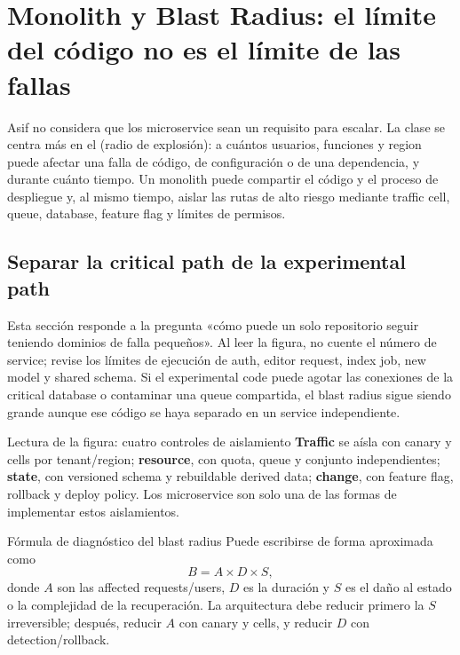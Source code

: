 \section{Monolith y Blast Radius: el límite del código no es el límite de las fallas}

Asif no considera que los microservice sean un requisito para escalar. La clase se centra más en el  (radio de explosión): a cuántos usuarios, funciones y region puede afectar una falla de código, de configuración o de una dependencia, y durante cuánto tiempo. Un monolith puede compartir el código y el proceso de despliegue y, al mismo tiempo, aislar las rutas de alto riesgo mediante traffic cell, queue, database, feature flag y límites de permisos.

\subsection{Separar la critical path de la experimental path}

Esta sección responde a la pregunta «cómo puede un solo repositorio seguir teniendo dominios de falla pequeños». Al leer la figura, no cuente el número de service; revise los límites de ejecución de auth, editor request, index job, new model y shared schema. Si el experimental code puede agotar las conexiones de la critical database o contaminar una queue compartida, el blast radius sigue siendo grande aunque ese código se haya separado en un service independiente.


\begin{knowledgebox}{Lectura de la figura: cuatro controles de aislamiento}
\textbf{Traffic} se aísla con canary y cells por tenant/region; \textbf{resource}, con quota, queue y conjunto independientes; \textbf{state}, con versioned schema y rebuildable derived data; \textbf{change}, con feature flag, rollback y deploy policy. Los microservice son solo una de las formas de implementar estos aislamientos.
\end{knowledgebox}

\begin{importantbox}{Fórmula de diagnóstico del blast radius}
Puede escribirse de forma aproximada como
\[
B=A\times D\times S,
\]
donde $A$ son las affected requests/users, $D$ es la duración y $S$ es el daño al estado o la complejidad de la recuperación. La arquitectura debe reducir primero la $S$ irreversible; después, reducir $A$ con canary y cells, y reducir $D$ con detection/rollback.
\end{importantbox}

